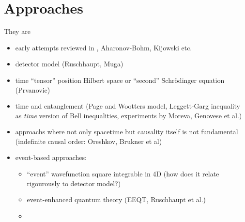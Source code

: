 \section{Approaches}

They are

\begin{itemize}
\item early attempts reviewed in \cite{TQM1, TQM2}, Aharonov-Bohm, Kijowski etc.
\item detector model (Ruschhaupt, Muga) \cite{TQM1, TQM2}
\item
    time ``tensor'' position Hilbert space or ``second'' Schr\"odinger equation (Prvanovic)
\item time and entanglement (Page and Wootters model, Leggett-Garg inequality as \emph{time} version of Bell inequalities, experiments by Moreva, Genovese et al.)
\item approachs where not only spacetime but causality itself is not fundamental (indefinite causal order: Oreshkov, Brukner et al)
\item event-based approaches: 
    \begin{itemize}
        \item ``event'' wavefunction square integrable in 4D (how does it relate rigourously to detector model?)
        \item event-enhanced quantum theory (EEQT, Ruschhaupt et al.)
        \item 
    \end{itemize}
\end{itemize}